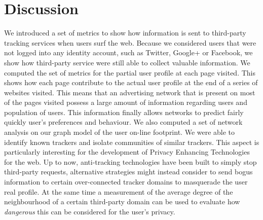 \section{Discussion}
\noindent
We introduced a set of metrics to show how information is sent to third-party tracking services when users surf the web. Because we considered users that were not logged into any identity account, such as Twitter, Google+ or Facebook, we show how third-party service were still able to collect valuable information.
We computed the set of metrics for the partial user profile at each page visited. This shows how each page contribute to the actual user profile at the end of a series of websites visited. This means that an advertising network that is present on most of the pages visited possess a large amount of information regarding users and population of users. This information finally allows networks to predict fairly quickly user's preferences and behaviour.
We also computed a set of network analysis on our graph model of the user on-line footprint. We were able to identify known trackers and isolate communities of similar trackers. This aspect is particularly interesting for the development of Privacy Enhancing Technologies for the web. Up to now, anti-tracking technologies have been built to simply stop third-party requests, alternative strategies might instead consider to send bogus information to certain over-connected tracker domains to masquerade the user real profile. At the same time a measurement of the average degree of the neighbourhood of a certain third-party domain can be used to evaluate how \emph{dangerous} this can be considered for the user's privacy.

